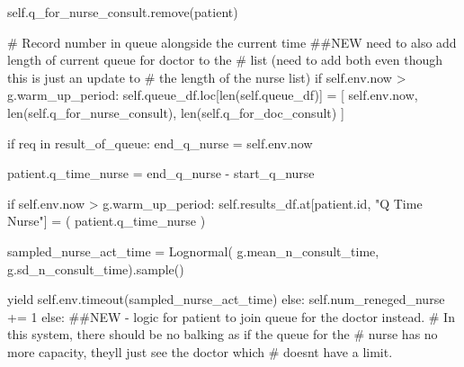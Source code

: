 \documentclass[
  letterpaper,
  DIV=11,
  numbers=noendperiod]{scrreprt}
\newenvironment{Shaded}{}{}
\newcommand{\BuiltInTok}[1]{\textcolor[rgb]{0.84,0.23,0.29}{#1}}
\newcommand{\CommentTok}[1]{\textcolor[rgb]{0.42,0.45,0.49}{#1}}
\newcommand{\ControlFlowTok}[1]{\textcolor[rgb]{0.84,0.23,0.29}{#1}}
\newcommand{\DecValTok}[1]{\textcolor[rgb]{0.00,0.36,0.77}{#1}}
\newcommand{\KeywordTok}[1]{\textcolor[rgb]{0.84,0.23,0.29}{#1}}
\newcommand{\NormalTok}[1]{\textcolor[rgb]{0.14,0.16,0.18}{#1}}
\newcommand{\OperatorTok}[1]{\textcolor[rgb]{0.14,0.16,0.18}{#1}}
\newcommand{\StringTok}[1]{\textcolor[rgb]{0.01,0.18,0.38}{#1}}
\newcommand{\VariableTok}[1]{\textcolor[rgb]{0.89,0.38,0.04}{#1}}
\begin{document}
\begin{tcolorbox}
\begin{Shaded}
\begin{Highlighting}[]
                \VariableTok{self}\NormalTok{.q\_for\_nurse\_consult.remove(patient)}

                \CommentTok{\# Record number in queue alongside the current time}
                \CommentTok{\#\#NEW need to also add length of current queue for doctor to the}
                \CommentTok{\# list (need to add both even though this is just an update to}
                \CommentTok{\# the length of the nurse list)}
                \ControlFlowTok{if} \VariableTok{self}\NormalTok{.env.now }\OperatorTok{\textgreater{}}\NormalTok{ g.warm\_up\_period:}
                    \VariableTok{self}\NormalTok{.queue\_df.loc[}\BuiltInTok{len}\NormalTok{(}\VariableTok{self}\NormalTok{.queue\_df)] }\OperatorTok{=}\NormalTok{ [}
                        \VariableTok{self}\NormalTok{.env.now,}
                        \BuiltInTok{len}\NormalTok{(}\VariableTok{self}\NormalTok{.q\_for\_nurse\_consult),}
                        \BuiltInTok{len}\NormalTok{(}\VariableTok{self}\NormalTok{.q\_for\_doc\_consult)}
\NormalTok{                    ]}

                \ControlFlowTok{if}\NormalTok{ req }\KeywordTok{in}\NormalTok{ result\_of\_queue:}
\NormalTok{                    end\_q\_nurse }\OperatorTok{=} \VariableTok{self}\NormalTok{.env.now}

\NormalTok{                    patient.q\_time\_nurse }\OperatorTok{=}\NormalTok{ end\_q\_nurse }\OperatorTok{{-}}\NormalTok{ start\_q\_nurse}

                    \ControlFlowTok{if} \VariableTok{self}\NormalTok{.env.now }\OperatorTok{\textgreater{}}\NormalTok{ g.warm\_up\_period:}
                        \VariableTok{self}\NormalTok{.results\_df.at[patient.}\BuiltInTok{id}\NormalTok{, }\StringTok{"Q Time Nurse"}\NormalTok{] }\OperatorTok{=}\NormalTok{ (}
\NormalTok{                            patient.q\_time\_nurse}
\NormalTok{                        )}

\NormalTok{                    sampled\_nurse\_act\_time }\OperatorTok{=}\NormalTok{ Lognormal(}
\NormalTok{                        g.mean\_n\_consult\_time, g.sd\_n\_consult\_time).sample()}

                    \ControlFlowTok{yield} \VariableTok{self}\NormalTok{.env.timeout(sampled\_nurse\_act\_time)}
                \ControlFlowTok{else}\NormalTok{:}
                    \VariableTok{self}\NormalTok{.num\_reneged\_nurse }\OperatorTok{+=} \DecValTok{1}
        \ControlFlowTok{else}\NormalTok{:}
            \CommentTok{\#\#NEW {-} logic for patient to join queue for the doctor instead.}
            \CommentTok{\# In this system, there should be no balking as if the queue for the}
            \CommentTok{\# nurse has no more capacity, they\textquotesingle{}ll just see the doctor which}
            \CommentTok{\# doesn\textquotesingle{}t have a limit.}


\end{Highlighting}
\end{Shaded}
\end{tcolorbox}
\end{document}
